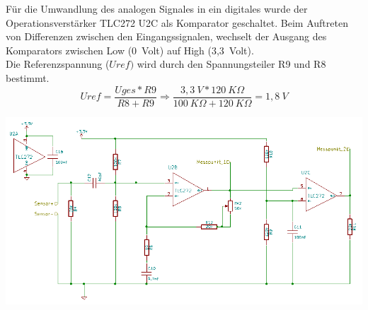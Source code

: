 Für die Umwandlung des analogen Signales in ein digitales wurde der Operationsverstärker TLC272 U2C als Komparator geschaltet. Beim Auftreten von Differenzen zwischen den Eingangssignalen, wechselt der Ausgang des Komparators zwischen Low (0~Volt) auf High (3,3~Volt).\\ Die Referenzspannung (\(\displaystyle Uref)\)  wird durch den Spannungsteiler R9 und R8 bestimmt.
\onehalfspacing \\
\[\displaystyle Uref=\frac{Uges*R9}{R8+R9}\Rightarrow\frac{3,3~V*120~K\Omega}{100~K\Omega+120~K\Omega}=1,8~V \]
\singlespacing
\begin{center}
\begin{minipage}{0.75\textwidth}
\includegraphics[width=1\textwidth%
]{Abbildungen/Empfaenger.png}
\label{fig:Empfaengerschaltung}
\end{minipage}\\
\end{center}

